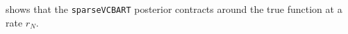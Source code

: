 \documentclass[11pt]{article}
\theoremstyle{plain}
\newtheorem{lemma}{Lemma}
\theoremstyle{definition}
\theoremstyle{plain}
\begin{document}
 shows that the \texttt{sparseVCBART} posterior contracts around the true function at a rate $r_N$. 
\end{document}
